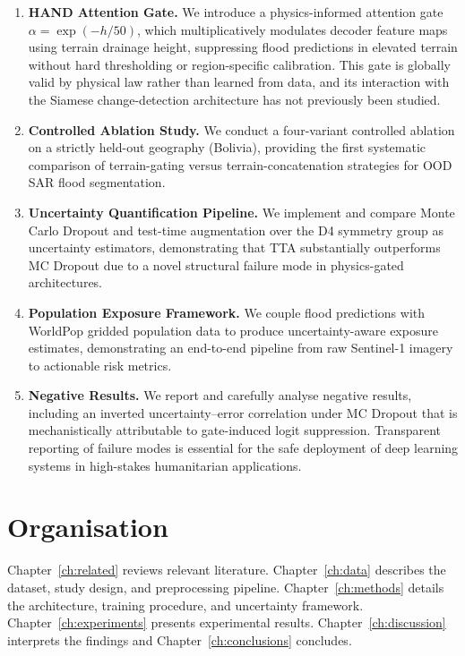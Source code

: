 \documentclass[12pt,oneside]{report}
\begin{document}
\begin{enumerate}
  \item \textbf{HAND Attention Gate.}  We introduce a physics-informed
        attention gate $\alpha = \exp(-h/50)$, which multiplicatively modulates
        decoder feature maps using terrain drainage height, suppressing flood
        predictions in elevated terrain without hard thresholding or
        region-specific calibration.  This gate is globally valid by physical
        law rather than learned from data, and its interaction with the Siamese
        change-detection architecture has not previously been studied.

  \item \textbf{Controlled Ablation Study.}  We conduct a four-variant
        controlled ablation on a strictly held-out geography (Bolivia),
        providing the first systematic comparison of terrain-gating versus
        terrain-concatenation strategies for OOD SAR flood segmentation.

  \item \textbf{Uncertainty Quantification Pipeline.}  We implement and
        compare Monte Carlo Dropout and test-time augmentation over the D4
        symmetry group as uncertainty estimators, demonstrating that TTA
        substantially outperforms MC Dropout due to a novel structural
        failure mode in physics-gated architectures.

  \item \textbf{Population Exposure Framework.}  We couple flood predictions
        with WorldPop gridded population data to produce uncertainty-aware
        exposure estimates, demonstrating an end-to-end pipeline from raw
        Sentinel-1 imagery to actionable risk metrics.

  \item \textbf{Negative Results.}  We report and carefully analyse negative
        results, including an inverted uncertainty–error correlation under MC
        Dropout that is mechanistically attributable to gate-induced logit
        suppression.  Transparent reporting of failure modes is essential for
        the safe deployment of deep learning systems in high-stakes
        humanitarian applications.
\end{enumerate}

\section{Organisation}

Chapter~\ref{ch:related} reviews relevant literature.
Chapter~\ref{ch:data} describes the dataset, study design, and preprocessing
pipeline.
Chapter~\ref{ch:methods} details the architecture, training procedure, and
uncertainty framework.
Chapter~\ref{ch:experiments} presents experimental results.
Chapter~\ref{ch:discussion} interprets the findings and Chapter~\ref{ch:conclusions}
concludes.
\end{document}
